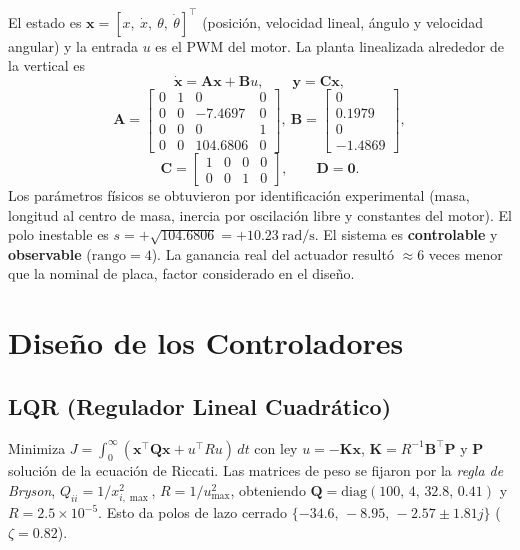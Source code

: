 \documentclass[conference]{IEEEtran}
\newcommand{\vect}[1]{\mathbf{#1}}
\newcommand{\mat}[1]{\mathbf{#1}}
\begin{document}
El estado es $\vect{x}=[x,\ \dot{x},\ \theta,\ \dot{\theta}]^\top$ (posici\'on,
velocidad lineal, \'angulo y velocidad angular) y la entrada $u$ es el PWM del
motor. La planta linealizada alrededor de la vertical es
\begin{equation}
\dot{\vect{x}}=\mat{A}\vect{x}+\mat{B}u,\qquad \vect{y}=\mat{C}\vect{x},
\end{equation}
\begin{equation}
\mat{A}=\begin{bmatrix}0&1&0&0\\0&0&-7.4697&0\\0&0&0&1\\0&0&104.6806&0\end{bmatrix},\
\mat{B}=\begin{bmatrix}0\\0.1979\\0\\-1.4869\end{bmatrix},
\end{equation}
\begin{equation}
\mat{C}=\begin{bmatrix}1&0&0&0\\0&0&1&0\end{bmatrix},\qquad \mat{D}=\vect{0}.
\end{equation}
Los par\'ametros f\'isicos se obtuvieron por identificaci\'on experimental (masa,
longitud al centro de masa, inercia por oscilaci\'on libre y constantes del
motor). El polo inestable es $s=+\sqrt{104.6806}=+10.23~\mathrm{rad/s}$. El
sistema es \textbf{controlable} y \textbf{observable} ($\mathrm{rango}=4$). La
ganancia real del actuador result\'o $\approx 6$ veces menor que la nominal de
placa, factor considerado en el dise\~no.

\section{Dise\~no de los Controladores}
\subsection{LQR (Regulador Lineal Cuadr\'atico)}
Minimiza $J=\int_0^\infty(\vect{x}^\top\mat{Q}\vect{x}+u^\top\!Ru)\,dt$ con ley
$u=-\mat{K}\vect{x}$, $\mat{K}=R^{-1}\mat{B}^\top\mat{P}$ y $\mat{P}$ soluci\'on de
la ecuaci\'on de Riccati. Las matrices de peso se fijaron por la \emph{regla de
Bryson}, $Q_{ii}=1/x_{i,\max}^2$, $R=1/u_{\max}^2$, obteniendo
$\mat{Q}=\mathrm{diag}(100,\,4,\,32.8,\,0.41)$ y $R=2.5\times10^{-5}$. Esto da
polos de lazo cerrado $\{-34.6,\,-8.95,\,-2.57\pm1.81j\}$ ($\zeta=0.82$).
\end{document}
